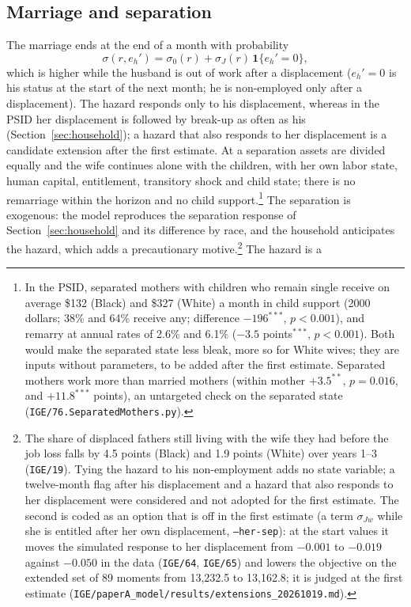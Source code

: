 \subsection{Marriage and separation}

The marriage ends at the end of a month with probability
\begin{equation}\label{eq:sep}
  \sigma(r, e_h') = \sigma_0(r) + \sigma_J(r)\, \mathbf{1}\{e_h' = 0\},
\end{equation}
which is higher while the husband is out of work after a displacement ($e_h' = 0$ is his status at the start of the
next month; he is non-employed only after a displacement). The hazard responds only to his displacement, whereas in
the PSID her displacement is followed by break-up as often as his (Section~\ref{sec:household}); a hazard that also
responds to her displacement is a candidate extension after the first estimate. At a separation assets are divided equally and the wife
continues alone with the children, with her own labor state, human capital, entitlement, transitory shock and child
state; there is no remarriage within the horizon and no child support.\footnote{In the PSID, separated mothers with
children who remain single receive on average \$132 (Black) and \$327 (White) a month in child support (2000 dollars;
38\% and 64\% receive any; difference $-196^{***}$, $p<0.001$), and remarry at annual rates of 2.6\% and 6.1\%
($-3.5$ points$^{***}$, $p<0.001$). Both would make the separated state less bleak, more so for White wives; they are
inputs without parameters, to be added after the first estimate. Separated mothers work more than married mothers
(within mother $+3.5^{**}$, $p=0.016$, and $+11.8^{***}$ points), an untargeted check on the separated state
(\texttt{IGE/76.SeparatedMothers.py}).} The separation is exogenous: the model
reproduces the separation response of Section~\ref{sec:household} and its difference by race, and the household
anticipates the hazard, which adds a precautionary motive.\footnote{The share of displaced fathers still living with
the wife they had before the job loss falls by 4.5 points (Black) and 1.9 points (White) over years 1--3
(\texttt{IGE/19}). Tying the hazard to his non-employment adds no state variable; a twelve-month flag after his
displacement and a hazard that also responds to her displacement were considered and not adopted for the first
estimate. The second is coded as an option that is off in the first estimate (a term $\sigma_{Jw}$ while she is
entitled after her own displacement, \texttt{--her-sep}): at the start values it moves the simulated response to her
displacement from $-0.001$ to $-0.019$ against $-0.050$ in the data (\texttt{IGE/64}, \texttt{IGE/65}) and lowers the
objective on the extended set of 89 moments from 13{,}232.5 to 13{,}162.8; it is judged at the first estimate
(\texttt{IGE/paperA\_model/results/extensions\_20261019.md}).} The hazard is a
